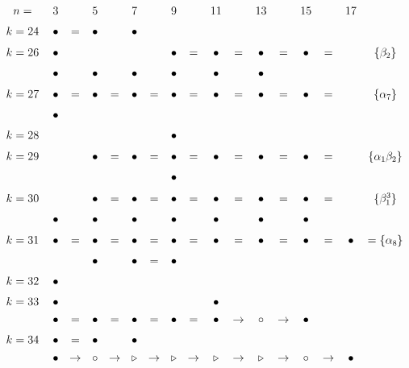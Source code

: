 \documentclass{article}
\begin{document}
\(
\begin{tikzcd}[nodes={font=\large},row sep=0.2cm,column sep=0.1cm]
n= & & 3 & & 5 & & 7 & & 9 & & 11 & & 13 & & 15 & & 17 &  \\
k=24 && \bullet &=& \bullet && \bullet \\
k=26 && \bullet && && && \bullet &=& \bullet &=& \bullet &=& \bullet & = && \{\beta_2\} \\
 && \bullet && \bullet && \bullet && \bullet && \bullet && \bullet \\
k=27 && \bullet &=& \bullet &=& \bullet &=& \bullet &=& \bullet &=& \bullet &=& \bullet & = && \{\alpha_7\} \\
 && \bullet \\
k=28 && && && && \bullet \\
k=29 && && \bullet &=& \bullet &=& \bullet &=& \bullet &=& \bullet &=& \bullet & = && \{\alpha_1\beta_2\} \\
 && && && && \bullet \\
k=30 && && \bullet &=& \bullet &=& \bullet &=& \bullet &=& \bullet &=& \bullet & = && \{\beta_1^3\} \\
 && \bullet && \bullet && \bullet && \bullet && \bullet && \bullet && \bullet \\
k=31 && \bullet &=& \bullet &=& \bullet &=& \bullet &=& \bullet &=& \bullet &=& \bullet & = & \bullet & = \{\alpha_8\} \\
 && && \bullet && \bullet &=& \bullet && && && \\
k=32 && \bullet && && && \\
k=33 && \bullet && && && && \bullet \\
 && \bullet &=& \bullet &=& \bullet &=& \bullet &=& \bullet & \rightarrow & \circ & \rightarrow & \bullet \\
k=34 && \bullet &=& \bullet && \bullet \\
 && \bullet & \rightarrow & \circ & \rightarrow & \triangleright & \rightarrow & \triangleright & \rightarrow & \triangleright & \rightarrow & \triangleright & \rightarrow & \circ & \rightarrow & \bullet \\
\end{tikzcd}
\)
\end{document}
